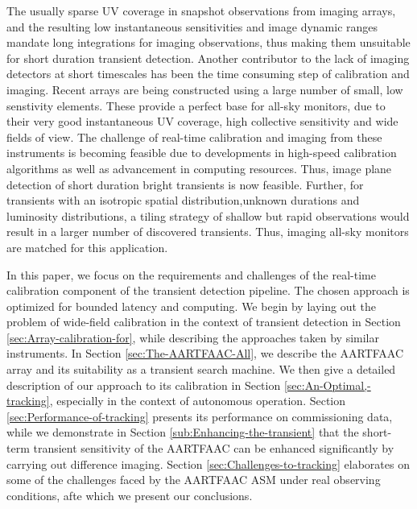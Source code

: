\documentclass{aa}
\begin{document}
The usually sparse UV coverage in snapshot observations from imaging arrays, and
the resulting  low instantaneous sensitivities and image  dynamic ranges mandate
long  integrations for  imaging observations,  thus making  them  unsuitable for
short duration transient detection.  Another  contributor to the lack of imaging
detectors at  short timescales has been  the time consuming  step of calibration
and imaging. Recent arrays are being  constructed using a large number of small,
low senstivity elements. These provide  a perfect base for all-sky monitors, due
to their  very good instantaneous  UV coverage, high collective  sensitivity and
wide fields  of view.  The challenge of  real-time calibration and  imaging from
these  instruments  is  becoming  feasible  due to  developments  in  high-speed
calibration  algorithms as  well as  advancement in  computing  resources. Thus,
image   plane   detection  of   short   duration   bright   transients  is   now
feasible. Further, for transients with an isotropic spatial distribution,unknown
durations and luminosity  distributions, a tiling strategy of  shallow but rapid
observations would  result in  a larger number  of discovered  transients. Thus,
imaging all-sky monitors are matched for this application.

In this  paper, we  focus on  the requirements and  challenges of  the real-time
calibration component of the  transient detection pipeline.  The chosen approach
is optimized  for bounded  latency and  computing.  We begin  by laying  out the
problem  of wide-field  calibration in  the  context of  transient detection  in
Section \ref{sec:Array-calibration-for},  while describing the  approaches taken
by similar  instruments. In Section \ref{sec:The-AARTFAAC-All},  we describe the
AARTFAAC array and its suitability as a transient search machine. We then give a
detailed   description  of   our  approach   to  its   calibration   in  Section
\ref{sec:An-Optimal,-tracking},   especially  in   the  context   of  autonomous
operation. Section \ref{sec:Performance-of-tracking} presents its performance on
commissioning      data,      while      we     demonstrate      in      Section
\ref{sub:Enhancing-the-transient} that  the short-term transient  sensitivity of
the  AARTFAAC   can  be  enhanced  significantly  by   carrying  out  difference
imaging.  Section  \ref{sec:Challenges-to-tracking} elaborates  on  some of  the
challenges  faced  by  the  AARTFAAC  ASM under  real  observing  conditions, afte which we present our conclusions.
\end{document}
